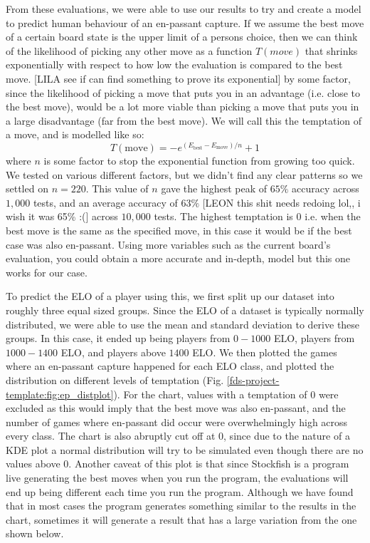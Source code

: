 \documentclass[10pt,a4paper,twocolumn]{article}
\begin{document}
From these evaluations, we were able to use our results to try and create a model to predict human behaviour of an en-passant capture. If we assume the best move of a certain board state is the upper limit of a persons choice, then we can think of the likelihood of picking any other move as a function $T(move)$ that shrinks exponentially with respect to how low the evaluation is compared to the best move. [LILA see if can find something to prove its exponential] by some factor, since the likelihood of picking a move that puts you in an advantage (i.e. close to the best move), would be a lot more viable than picking a move that puts you in a large disadvantage (far from the best move). We will call this the temptation of a move, and is modelled like so:
$$T(\text{move})= -e^{(E_{\text{best}} - E_{\text{move}})/{n}} + 1$$
where $n$ is some factor to stop the exponential function from growing too quick. We tested on various different factors, but we didn't find any clear patterns so we settled on $n=220$. This value of $n$ gave the highest peak of $65\%$ accuracy across $1,000$ tests, and an average accuracy of $63\%$ [LEON this shit needs redoing lol,, i wish it was 65\% :(] across $10,000$ tests. The highest temptation is $0$ i.e. when the best move is the same as the specified move, in this case it would be if the best case was also en-passant. Using more variables such as the current board's evaluation, you could obtain a more accurate and in-depth, model but this one works for our case. \newline

To predict the ELO of a player using this, we first split up our dataset into roughly three equal sized groups. Since the ELO of a dataset is typically normally distributed, we were able to use the mean and standard deviation to derive these groups. In this case, it ended up being players from $0 - 1000$ ELO, players from $1000 - 1400$ ELO, and players above $1400$ ELO. We then plotted the games where an en-passant capture happened for each ELO class, and plotted the distribution on different levels of temptation (Fig. \ref{fds-project-template:fig:ep_distplot}). For the chart, values with a temptation of $0$ were excluded as this would imply that the best move was also en-passant, and the number of games where en-passant did occur were overwhelmingly high across every class. The chart is also abruptly cut off at $0$, since due to the nature of a KDE plot a normal distribution will try to be simulated even though there are no values above $0$. Another caveat of this plot is that since Stockfish is a program live generating the best moves when you run the program, the evaluations will end up being different each time you run the program. Although we have found that in most cases the program generates something similar to the results in the chart, sometimes it will generate a result that has a large variation from the one shown below. \newline
\end{document}
